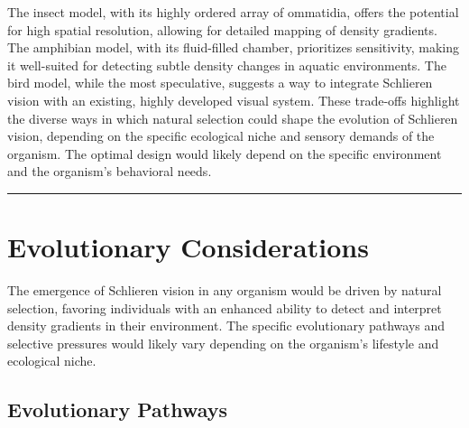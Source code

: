 \documentclass[11pt]{article}
\begin{document}
The insect model, with its highly ordered array of ommatidia, offers the potential for high spatial resolution, allowing for detailed mapping of density gradients. The amphibian model, with its fluid-filled chamber, prioritizes sensitivity, making it well-suited for detecting subtle density changes in aquatic environments. The bird model, while the most speculative, suggests a way to integrate Schlieren vision with an existing, highly developed visual system. These trade-offs highlight the diverse ways in which natural selection could shape the evolution of Schlieren vision, depending on the specific ecological niche and sensory demands of the organism. The optimal design would likely depend on the specific environment and the organism's behavioral needs.

\bigskip\noindent\rule{\linewidth}{0.4pt}\bigskip

\section{Evolutionary Considerations}

The emergence of Schlieren vision in any organism would be driven by natural selection, favoring individuals with an enhanced ability to detect and interpret density gradients in their environment. The specific evolutionary pathways and selective pressures would likely vary depending on the organism's lifestyle and ecological niche.

\subsection{Evolutionary Pathways}
\end{document}
